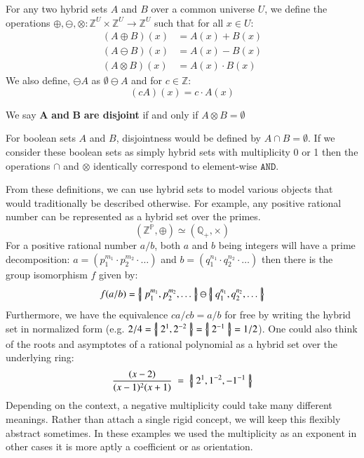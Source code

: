 \begin{definition}
	For any two hybrid sets $A$ and $B$ over a common universe $U$, 
	we define the operations $\oplus, \ominus, \otimes : \mathbb{Z}^U \times \mathbb{Z}^U \to \mathbb{Z}^U$ 
	such that for all $x \in U$:
	\begin{align}
		(A \oplus B)(x) 	&= A(x) + B(x) \\
		(A \ominus B)(x) 	&= A(x) - B(x) \\
		(A \otimes B)(x) 	&= A(x) \cdot B(x)
	\end{align}
	We also define, $\ominus A$ as $\emptyset \ominus A$ and for $c \in \mathbb{Z}$:
	\begin{equation}
		(cA)(x) = c \cdot A(x)
	\end{equation}
\end{definition}


\begin{definition}
	We say $\boldsymbol{A}$ \textbf{and} $\boldsymbol{B}$ \textbf{are disjoint} if and only if $A \otimes B = \emptyset$
\end{definition}
For boolean sets $A$ and $B$, disjointness would be defined by $A \cap B = \emptyset$.
If we consider these boolean sets as simply hybrid sets with multiplicity 0 or 1 then the operations $\cap$ and $\otimes$
identically correspond to element-wise $\texttt{AND}$.


From these definitions, we can use hybrid sets to model various objects that would traditionally be described otherwise. 
For example, any positive rational number can be represented as a hybrid set over the primes.
\begin{equation*}
	(\mathbb{Z}^\mathbb{P}, \oplus) \simeq (\mathbb{Q}_+,\times)
\end{equation*}
For a positive rational number $a/b$, both $a$ and $b$ being integers will have a prime decomposition: 
$a=(p_1^{m_1}\cdot p_2^{m_2} \cdot \ldots)$ and $b=(q_1^{n_1} \cdot q_2^{n_2} \cdot \ldots)$
then there is the group isomorphism $f$ given by:
\begin{equation*}
	f(a/b) = \left\{ \! \left| \; p_1^{m_1}, p_2^{m_2}, \ldots \; \right| \! \right\} \ominus \left\{ \! \left| \; q_1^{n_1}, q_2^{n_2}, \ldots \; \right| \! \right\}
\end{equation*}
Furthermore, we have the equivalence $ca/cb = a/b$ for free by writing the hybrid set in normalized form
(e.g. $2/4 = \left\{ \! \left| \; 2^1, 2^{-2} \; \right| \! \right\} = \left\{ \! \left| \; 2^{-1} \; \right| \! \right\} = 1/2$).
One could also think of the roots and asymptotes of a rational polynomial as a hybrid set over the underlying ring:
\begin{equation*}
	\frac{(x-2)}{(x-1)^2(x+1)} \;=\; \left\{ \! \left| \;  2^1, 1^{-2}, -1^{-1}  \; \right| \! \right\}
\end{equation*}
Depending on the context, a negative multiplicity could take many different meanings.
Rather than attach a single rigid concept, we will keep this flexibly abstract sometimes.
In these examples we used the multiplicity as an exponent in other cases it is more aptly a coefficient  or as orientation.


